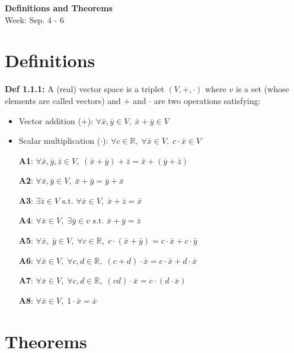 \noindent
\textbf{\LARGE Definitions and Theorems} \\
\Large Week: Sep. 4 - 6

\section{Definitions}

\textbf{Def 1.1.1:} A (real) vector space is a triplet $(V, +, \cdot )$ where $v$ is a set (whose elements are called vectors) and $+$ and $\cdot$ are two operations satisfying: 
\begin{itemize}
  \item Vector addition ($+$): $\forall \bar x, \bar y \in V, \; \bar x + \bar y \in V $
  \item Scalar multiplication ($\cdot$): $\forall c \in \mathbb{R}, \; \forall \bar x \in V, \; c \cdot \bar x \in V$
\end{itemize}
\begin{itemize}
    \item[\textbf{A1}:] {$\forall \bar x, \bar y, \bar z \in V, \; (\bar x+\bar y) + \bar z = \bar x + (\bar y + \bar z)$} 
    \item[\textbf{A2}:] {$\forall \bar x, \bar y \in V, \; \bar x + \bar y = \bar y + \bar x$}
    \item[\textbf{A3}:] {$\exists \bar z \in V \text{ s.t. } \forall \bar x \in V, \; \bar x + \bar z = \bar x$}
    \item[\textbf{A4}:] {$\forall \bar x \in V, \; \exists \bar y \in v \text{ s.t. } \bar x + \bar y = \bar z$}
    \item[\textbf{A5}:] {$\forall \bar x, \; \bar y \in V, \; \forall c \in \mathbb{R}, \; c \cdot (\bar x + \bar y) = c \cdot \bar x + c \cdot \bar y$}
    \item[\textbf{A6}:] {$\forall \bar x \in V, \; \forall c, d \in \mathbb{R}, \; (c + d) \cdot \bar x = c \cdot \bar x + d \cdot \bar x$}
    \item[\textbf{A7}:] {$\forall \bar x \in V, \; \forall c, d \in \mathbb{R}, \; (cd) \cdot \bar x = c \cdot (d \cdot \bar x)$}
    \item[\textbf{A8}:] {$\forall \bar x \in V, \; 1 \cdot \bar x = \bar x$} 
\end{itemize}

\pagebreak
\section{Theorems}

